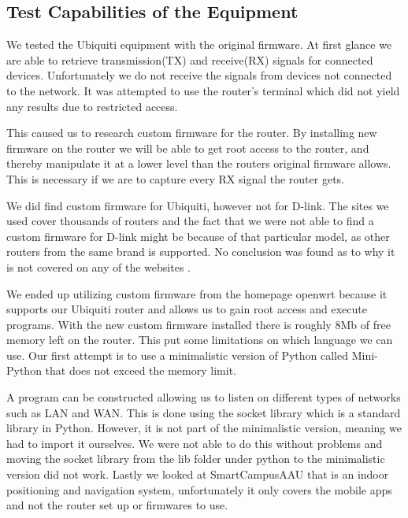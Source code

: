 \subsection*{Test Capabilities of the Equipment}
We tested the Ubiquiti equipment with the original firmware. At first glance we are able to retrieve transmission(TX) and receive(RX) signals for connected devices. Unfortunately we do not receive the signals from devices not connected to the network. It was attempted to use the router's terminal which did not yield any results due to restricted access.

This caused us to research custom firmware for the router. By installing new firmware on the router we will be able to get root access to the router, and thereby manipulate it at a lower level than the routers original firmware allows. This is necessary if we are to capture every RX signal the router gets.

We did find custom firmware for Ubiquiti, however not for D-link. The sites we used cover thousands of routers and the fact that we were not able to find a custom firmware for D-link might be because of that particular model, as other routers from the same brand is supported. No conclusion was found as to why it is not covered on any of the websites \cite{firmware_1}\cite{firmware_2}\cite{firmware_3}\cite{firmware_4}\cite{firmware_5}\cite{firmware_6}.

We ended up utilizing custom firmware from the homepage openwrt because it supports our Ubiquiti router and allows us to gain root access and execute programs. With the new custom firmware installed there is roughly 8Mb of free memory left on the router. This put some limitations on which language we can use. Our first attempt is to use a minimalistic version of Python called Mini-Python that does not exceed the memory limit.

A program can be constructed allowing us to listen on different types of networks such as LAN and WAN. This is done using the socket library which is a standard library in Python. However, it is not part of the minimalistic version, meaning we had to import it ourselves. We were not able to do this without problems and moving the socket library from the lib folder under python to the minimalistic version did not work. Lastly we looked at SmartCampusAAU that is an indoor positioning and navigation system, unfortunately it only covers the mobile apps and not the router set up or firmwares to use.

